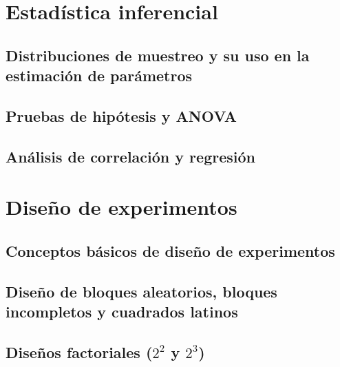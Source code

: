 \documentclass{../Resume}
\begin{document}
\Portada
\Indice
\fancystyle
\onehalfspacing


\part{Estadística inferencial}

    \chapter{Distribuciones de muestreo y su uso en la estimación de parámetros}
    \chapter{Pruebas de hipótesis y ANOVA}
    \chapter{Análisis de correlación y regresión}
    
\part{Diseño de experimentos}

    \chapter{Conceptos básicos de diseño de experimentos}
    \chapter{Diseño de bloques aleatorios, bloques incompletos y cuadrados latinos}
    \chapter{Diseños factoriales ($2^{2}$ y $2^{3}$)}


\newpage


\end{document}
